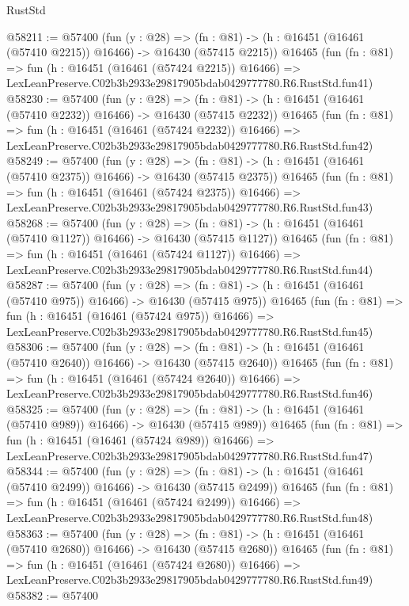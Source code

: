\begin{lexlean}{RustStd}
\begin{coremodule}
@58211 := @57400
    (fun (y : @28) =>
    (fn : @81) -> (h : @16451 (@16461 (@57410 @2215)) @16466) -> @16430 (@57415 @2215))
    @16465
    (fun (fn : @81) =>
    fun (h : @16451 (@16461 (@57424 @2215)) @16466) =>
    LexLeanPreserve.C02b3b2933e29817905bdab0429777780.R6.RustStd.fun41)
@58230 := @57400
    (fun (y : @28) =>
    (fn : @81) -> (h : @16451 (@16461 (@57410 @2232)) @16466) -> @16430 (@57415 @2232))
    @16465
    (fun (fn : @81) =>
    fun (h : @16451 (@16461 (@57424 @2232)) @16466) =>
    LexLeanPreserve.C02b3b2933e29817905bdab0429777780.R6.RustStd.fun42)
@58249 := @57400
    (fun (y : @28) =>
    (fn : @81) -> (h : @16451 (@16461 (@57410 @2375)) @16466) -> @16430 (@57415 @2375))
    @16465
    (fun (fn : @81) =>
    fun (h : @16451 (@16461 (@57424 @2375)) @16466) =>
    LexLeanPreserve.C02b3b2933e29817905bdab0429777780.R6.RustStd.fun43)
@58268 := @57400
    (fun (y : @28) =>
    (fn : @81) -> (h : @16451 (@16461 (@57410 @1127)) @16466) -> @16430 (@57415 @1127))
    @16465
    (fun (fn : @81) =>
    fun (h : @16451 (@16461 (@57424 @1127)) @16466) =>
    LexLeanPreserve.C02b3b2933e29817905bdab0429777780.R6.RustStd.fun44)
@58287 := @57400
    (fun (y : @28) =>
    (fn : @81) -> (h : @16451 (@16461 (@57410 @975)) @16466) -> @16430 (@57415 @975))
    @16465
    (fun (fn : @81) =>
    fun (h : @16451 (@16461 (@57424 @975)) @16466) =>
    LexLeanPreserve.C02b3b2933e29817905bdab0429777780.R6.RustStd.fun45)
@58306 := @57400
    (fun (y : @28) =>
    (fn : @81) -> (h : @16451 (@16461 (@57410 @2640)) @16466) -> @16430 (@57415 @2640))
    @16465
    (fun (fn : @81) =>
    fun (h : @16451 (@16461 (@57424 @2640)) @16466) =>
    LexLeanPreserve.C02b3b2933e29817905bdab0429777780.R6.RustStd.fun46)
@58325 := @57400
    (fun (y : @28) =>
    (fn : @81) -> (h : @16451 (@16461 (@57410 @989)) @16466) -> @16430 (@57415 @989))
    @16465
    (fun (fn : @81) =>
    fun (h : @16451 (@16461 (@57424 @989)) @16466) =>
    LexLeanPreserve.C02b3b2933e29817905bdab0429777780.R6.RustStd.fun47)
@58344 := @57400
    (fun (y : @28) =>
    (fn : @81) -> (h : @16451 (@16461 (@57410 @2499)) @16466) -> @16430 (@57415 @2499))
    @16465
    (fun (fn : @81) =>
    fun (h : @16451 (@16461 (@57424 @2499)) @16466) =>
    LexLeanPreserve.C02b3b2933e29817905bdab0429777780.R6.RustStd.fun48)
@58363 := @57400
    (fun (y : @28) =>
    (fn : @81) -> (h : @16451 (@16461 (@57410 @2680)) @16466) -> @16430 (@57415 @2680))
    @16465
    (fun (fn : @81) =>
    fun (h : @16451 (@16461 (@57424 @2680)) @16466) =>
    LexLeanPreserve.C02b3b2933e29817905bdab0429777780.R6.RustStd.fun49)
@58382 := @57400

\end{coremodule}
\end{lexlean}
